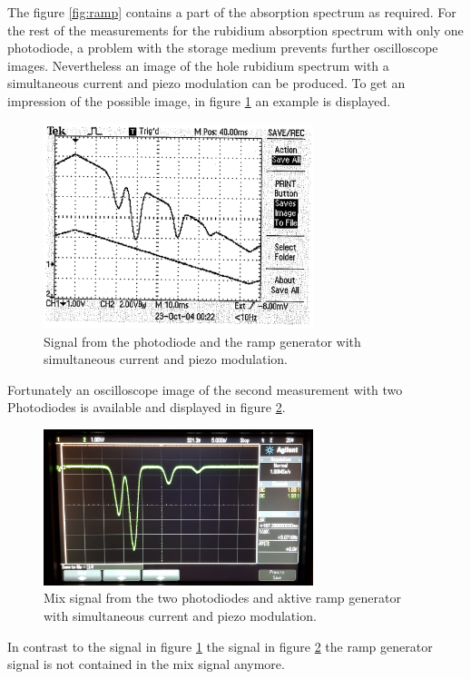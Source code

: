 The figure \ref{fig:ramp} contains a part of the
absorption spectrum as required.
For the rest of the measurements for the rubidium absorption spectrum
with only one photodiode, a problem with the storage medium
prevents further oscilloscope images.
Nevertheless an image of the hole rubidium spectrum
with a simultaneous current and piezo modulation
can be produced. To get an impression of the possible image,
in figure \ref{fig:theory_curve} an example is displayed.

\FloatBarrier
\begin{figure}
  \centering
  \includegraphics[width = 0.7\textwidth]{Rb_modulation.png}
  \caption{Signal from the photodiode and the ramp generator with
  simultaneous current and piezo modulation. \cite{V60}}
  \label{fig:theory_curve}
\end{figure}
\FloatBarrier

Fortunately an oscilloscope image of the second measurement
with two Photodiodes
is available and displayed in figure \ref{fig:2dioden}.

\FloatBarrier
\begin{figure}
  \centering
  \includegraphics[width = 0.7\textwidth]{./figures/Rb_spectrum.jpg}
  \caption{Mix signal from the two photodiodes and aktive ramp generator with
  simultaneous current and piezo modulation.}
  \label{fig:2dioden}
\end{figure}
\FloatBarrier

In contrast to the signal in figure \ref{fig:theory_curve}
the signal in figure \ref{fig:2dioden} the
ramp generator signal is not contained in the mix signal anymore.
